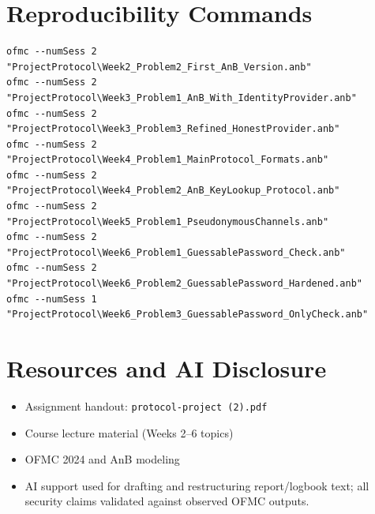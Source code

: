 \documentclass[11pt,a4paper]{article}
\begin{document}
\section{Reproducibility Commands}
\begin{lstlisting}
ofmc --numSess 2 "ProjectProtocol\Week2_Problem2_First_AnB_Version.anb"
ofmc --numSess 2 "ProjectProtocol\Week3_Problem1_AnB_With_IdentityProvider.anb"
ofmc --numSess 2 "ProjectProtocol\Week3_Problem3_Refined_HonestProvider.anb"
ofmc --numSess 2 "ProjectProtocol\Week4_Problem1_MainProtocol_Formats.anb"
ofmc --numSess 2 "ProjectProtocol\Week4_Problem2_AnB_KeyLookup_Protocol.anb"
ofmc --numSess 2 "ProjectProtocol\Week5_Problem1_PseudonymousChannels.anb"
ofmc --numSess 2 "ProjectProtocol\Week6_Problem1_GuessablePassword_Check.anb"
ofmc --numSess 2 "ProjectProtocol\Week6_Problem2_GuessablePassword_Hardened.anb"
ofmc --numSess 1 "ProjectProtocol\Week6_Problem3_GuessablePassword_OnlyCheck.anb"
\end{lstlisting}

\section*{Resources and AI Disclosure}
\begin{itemize}[leftmargin=1.2em]
  \item Assignment handout: \texttt{protocol-project (2).pdf}
  \item Course lecture material (Weeks 2--6 topics)
  \item OFMC 2024 and AnB modeling
  \item AI support used for drafting and restructuring report/logbook text;
  all security claims validated against observed OFMC outputs.
\end{itemize}
\end{document}
